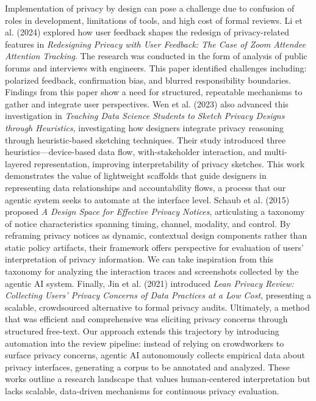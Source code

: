 \documentclass[12pt,letterpaper]{article}
\begin{document}
    Implementation of privacy by design can pose a challenge due to confusion of roles in development, limitations of tools, and high cost of formal reviews. Li et al. (2024) explored how user feedback shapes the redesign of privacy-related features in \textit{Redesigning Privacy with User Feedback: The Case of Zoom Attendee Attention Tracking}. The research was conducted in the form of analysis of public forums and interviews with engineers. This paper identified challenges including: polarized feedback, confirmation bias, and blurred responsibility boundaries. Findings from this paper show a need for structured, repeatable mechanisms to gather and integrate user perspectives. Wen et al. (2023) also advanced this investigation in \textit{Teaching Data Science Students to Sketch Privacy Designs through Heuristics}, investigating how designers integrate privacy reasoning through heuristic-based sketching techniques. Their study introduced three heuristics—device-based data flow, with-stakeholder interaction, and multi-layered representation, improving interpretability of privacy sketches. This work demonstrates the value of lightweight scaffolds that guide designers in representing data relationships and accountability flows, a process that our agentic system seeks to automate at the interface level. Schaub et al. (2015) proposed \textit{A Design Space for Effective Privacy Notices}, articulating a taxonomy of notice characteristics spanning timing, channel, modality, and control. By reframing privacy notices as dynamic, contextual design components rather than static policy artifacts, their framework offers perspective for evaluation of users' interpretation of privacy information. We can take inspiration from this taxonomy for analyzing the interaction traces and screenshots collected by the agentic AI system. Finally, Jin et al. (2021) introduced \textit{Lean Privacy Review: Collecting Users’ Privacy Concerns of Data Practices at a Low Cost}, presenting a scalable, crowdsourced alternative to formal privacy audits. Ultimately, a method that was efficient and comprehensive was eliciting privacy concerns through structured free-text. Our approach extends this trajectory by introducing automation into the review pipeline: instead of relying on crowdworkers to surface privacy concerns, agentic AI autonomously collects empirical data about privacy interfaces, generating a corpus to be annotated and analyzed. These works outline a research landscape that values human-centered interpretation but lacks scalable, data-driven mechanisms for continuous privacy evaluation.
    
\end{document}
